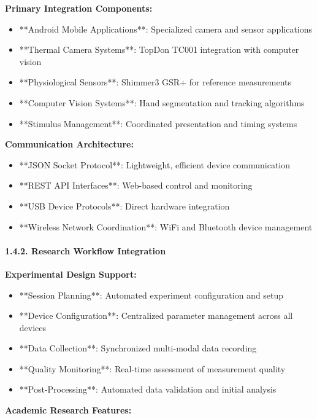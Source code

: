 \documentclass[12pt,a4paper]{article}
\begin{document}
\textbf{Primary Integration Components:}

\begin{itemize}
\item **Android Mobile Applications**: Specialized camera and sensor applications
\item **Thermal Camera Systems**: TopDon TC001 integration with computer vision
\item **Physiological Sensors**: Shimmer3 GSR+ for reference measurements
\item **Computer Vision Systems**: Hand segmentation and tracking algorithms
\item **Stimulus Management**: Coordinated presentation and timing systems

\end{itemize}
\textbf{Communication Architecture:}

\begin{itemize}
\item **JSON Socket Protocol**: Lightweight, efficient device communication
\item **REST API Interfaces**: Web-based control and monitoring
\item **USB Device Protocols**: Direct hardware integration
\item **Wireless Network Coordination**: WiFi and Bluetooth device management

\end{itemize}
\paragraph{1.4.2. Research Workflow Integration}

\textbf{Experimental Design Support:}

\begin{itemize}
\item **Session Planning**: Automated experiment configuration and setup
\item **Device Configuration**: Centralized parameter management across all devices
\item **Data Collection**: Synchronized multi-modal data recording
\item **Quality Monitoring**: Real-time assessment of measurement quality
\item **Post-Processing**: Automated data validation and initial analysis

\end{itemize}
\textbf{Academic Research Features:}
\end{document}
